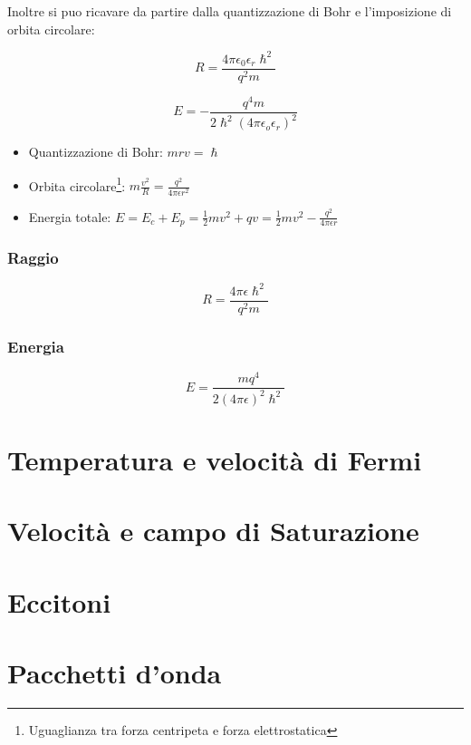 \documentclass[10pt,a4paper]{report}
\begin{document}
	Inoltre si puo ricavare da partire dalla quantizzazione di Bohr e l'imposizione di orbita circolare:



	\[
	R=\frac{4\pi \epsilon_0 \epsilon_r \hslash^2 }{q^2 m}
	\]

	\[
	E=-\frac{q^4 m}{2\hslash^2 (4\pi\epsilon_o\epsilon_r)^2}
	\]

	\begin{itemize}
	\item Quantizzazione di Bohr:   $mrv=\hslash$
	\item Orbita circolare\footnote{Uguaglianza tra forza centripeta e forza elettrostatica}:	$ m \frac {v^2} {R} = \frac{q^2}{4\pi \epsilon r^2}$
	\item Energia totale:	$E=E_c+E_p=\frac{1}{2}mv^2+qv=\frac{1}{2}mv^2-\frac{q^2}{4\pi \epsilon r}$
	\end{itemize}
		
		\subsection{Raggio}

		\[
		R=\frac{4\pi \epsilon \hslash^2 }{q^2 m}	
		\]

		\subsection{Energia}

		\[
		E=\frac{mq^4}{2(4\pi \epsilon)^2 \hslash^2}
		\]

\chapter{Temperatura e velocità di Fermi}

\chapter{Velocità e campo di Saturazione}

\chapter{Eccitoni}



\chapter{Pacchetti d'onda}
\end{document}
